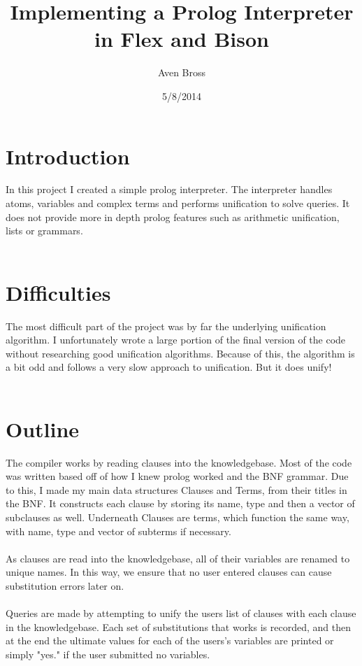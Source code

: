 \documentclass{article}
\title{Implementing a Prolog Interpreter in Flex and Bison}
\author{Aven Bross}
\date{5/8/2014}
\begin{document}
\maketitle






%
%

\section{Introduction}

In this project I created a simple prolog interpreter.  The interpreter handles atoms, variables and complex terms and performs unification to solve queries.  It does not provide more in depth prolog features such as arithmetic unification, lists or grammars.\\\\

\section{Difficulties}

The most difficult part of the project was by far the underlying unification algorithm.  I unfortunately wrote a large portion of the final version of the code without researching good unification algorithms.  Because of this, the algorithm is a bit odd and follows a very slow approach to unification.  But it does unify!\\\\

\section{Outline}

The compiler works by reading clauses into the knowledgebase.  Most of the code was written based off of how I knew prolog worked and the BNF grammar.  Due to this, I made my main data structures Clauses and Terms, from their titles in the BNF.  It constructs each clause by storing its name, type and then a vector of subclauses as well. Underneath Clauses are terms, which function the same way, with name, type and vector of subterms if necessary.\\\\
As clauses are read into the knowledgebase, all of their variables are renamed to unique names.  In this way, we ensure that no user entered clauses can cause substitution errors later on.\\\\
Queries are made by attempting to unify the users list of clauses with each clause in the knowledgebase.  Each set of substitutions that works is recorded, and then at the end the ultimate values for each of the users's variables are printed or simply "yes." if the user submitted no variables.
\end{document}
